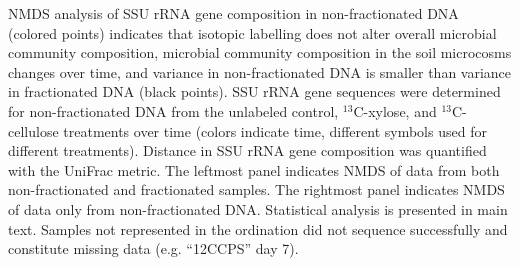 NMDS analysis of SSU rRNA gene composition in non-fractionated DNA (colored points) indicates
that isotopic labelling does not alter overall microbial community composition,
microbial community composition in the soil microcosms changes over time, and
variance in non-fractionated DNA is smaller than variance in fractionated DNA (black points).
SSU rRNA gene sequences were determined for non-fractionated DNA from the
unlabeled control, $^{13}$C-xylose, and $^{13}$C-cellulose treatments over time (colors
indicate time, different symbols used for different treatments). Distance in SSU
rRNA gene composition was quantified with the UniFrac metric. The
leftmost panel indicates NMDS of data from both non-fractionated and
fractionated samples. The rightmost panel indicates NMDS of data only from
non-fractionated DNA. Statistical analysis is presented in main text. Samples not
represented in the ordination did not sequence successfully and constitute
missing data (e.g. ``12CCPS'' day 7).
